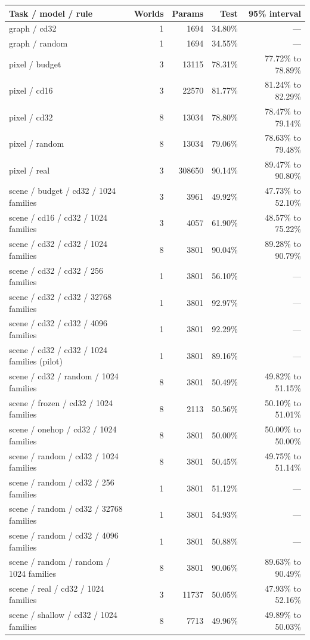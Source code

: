 \documentclass[10pt]{article}
\begin{document}
\begin{longtable}{p{.43\linewidth}rrrr}
\hline Task / model / rule & Worlds & Params & Test & 95\% interval\\\hline\endhead\hline\endfoot
graph / cd32 & 1 & 1694 & 34.80\% & ---\\
graph / random & 1 & 1694 & 34.55\% & ---\\
pixel / budget & 3 & 13115 & 78.31\% & 77.72\% to 78.89\%\\
pixel / cd16 & 3 & 22570 & 81.77\% & 81.24\% to 82.29\%\\
pixel / cd32 & 8 & 13034 & 78.80\% & 78.47\% to 79.14\%\\
pixel / random & 8 & 13034 & 79.06\% & 78.63\% to 79.48\%\\
pixel / real & 3 & 308650 & 90.14\% & 89.47\% to 90.80\%\\
scene / budget / cd32 / 1024 families & 3 & 3961 & 49.92\% & 47.73\% to 52.10\%\\
scene / cd16 / cd32 / 1024 families & 3 & 4057 & 61.90\% & 48.57\% to 75.22\%\\
scene / cd32 / cd32 / 1024 families & 8 & 3801 & 90.04\% & 89.28\% to 90.79\%\\
scene / cd32 / cd32 / 256 families & 1 & 3801 & 56.10\% & ---\\
scene / cd32 / cd32 / 32768 families & 1 & 3801 & 92.97\% & ---\\
scene / cd32 / cd32 / 4096 families & 1 & 3801 & 92.29\% & ---\\
scene / cd32 / cd32 / 1024 families (pilot) & 1 & 3801 & 89.16\% & ---\\
scene / cd32 / random / 1024 families & 8 & 3801 & 50.49\% & 49.82\% to 51.15\%\\
scene / frozen / cd32 / 1024 families & 8 & 2113 & 50.56\% & 50.10\% to 51.01\%\\
scene / onehop / cd32 / 1024 families & 8 & 3801 & 50.00\% & 50.00\% to 50.00\%\\
scene / random / cd32 / 1024 families & 8 & 3801 & 50.45\% & 49.75\% to 51.14\%\\
scene / random / cd32 / 256 families & 1 & 3801 & 51.12\% & ---\\
scene / random / cd32 / 32768 families & 1 & 3801 & 54.93\% & ---\\
scene / random / cd32 / 4096 families & 1 & 3801 & 50.88\% & ---\\
scene / random / random / 1024 families & 8 & 3801 & 90.06\% & 89.63\% to 90.49\%\\
scene / real / cd32 / 1024 families & 3 & 11737 & 50.05\% & 47.93\% to 52.16\%\\
scene / shallow / cd32 / 1024 families & 8 & 7713 & 49.96\% & 49.89\% to 50.03\%\\
\end{longtable}
\end{document}
